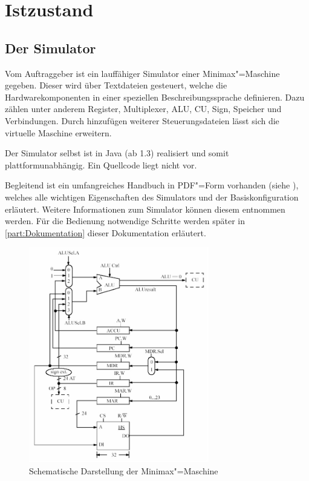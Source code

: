 \chapter{Istzustand}
\label{chapter:Pflichtenheft-Istzustand}

\section{Der Simulator}
\label{section:Pflichtenheft-Istzustand-Simulator}

Vom Auftraggeber ist ein lauffähiger Simulator einer Minimax"=Maschine gegeben. Dieser wird über Textdateien gesteuert, welche die Hardwarekomponenten in einer speziellen Beschreibungssprache definieren. Dazu zählen unter anderem Register, Multiplexer, ALU, CU, Sign, Speicher und Verbindungen. Durch hinzufügen weiterer Steuerungsdateien lässt sich die virtuelle Maschine erweitern.

Der Simulator selbst ist in Java (ab 1.3) realisiert und somit plattformunabhängig. Ein Quellcode liegt nicht vor.

Begleitend ist ein umfangreiches Handbuch in PDF"=Form vorhanden (siehe \cite{minimax-handbuch}), welches alle wichtigen Eigenschaften des Simulators und der Basiskonfiguration erläutert. Weitere Informationen zum Simulator können diesem entnommen werden. Für die Bedienung notwendige Schritte werden später in \autoref{part:Dokumentation} dieser Dokumentation erläutert.

\begin{figure}[htb]
    \centering
    \includegraphics[width=0.7\textwidth]{pflichtenheft/res/minimax.png}
    \caption{Schematische Darstellung der Minimax"=Maschine}
    \label{figure:Pflichtenheft-Istzustand-Simulator-Schema}
\end{figure}

